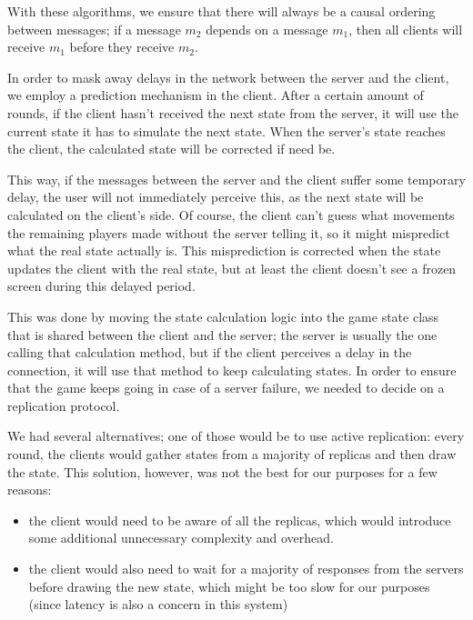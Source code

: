\documentclass[times, 10pt,twocolumn]{article}
\begin{document}
With these algorithms, we ensure that there will always be a causal ordering
between messages; if a message $m_2$ depends on a message $m_1$, then all
clients will receive $m_1$ before they receive $m_2$.


In order to mask away delays in the network between the server and the
client, we employ a prediction mechanism in the client. After a certain
amount of rounds, if the client hasn't received the next state from the
server, it will use the current state it has to simulate the next state.
When the server's state reaches the client, the calculated state will be
corrected if need be.

This way, if the messages between the server and the client suffer some
temporary delay, the user will not immediately perceive this, as the
next state will be calculated on the client's side. Of course, the client
can't guess what movements the remaining players made without the server
telling it, so it might mispredict what the real state actually is.
This misprediction is corrected when the state updates the client with
the real state, but at least the client doesn't see a frozen screen
during this delayed period.

This was done by moving the state calculation logic into the game state class
that is shared between the client and the server; the server is usually the
one calling that calculation method, but if the client perceives a delay in
the connection, it will use that method to keep calculating states.
In order to ensure that the game keeps going in case of a server failure,
we needed to decide on a replication protocol.

We had several alternatives; one of those would be to use active replication:
every round, the clients would gather states from a majority of replicas and
then draw the state. This solution, however, was not the best for our purposes
for a few reasons:
\begin{itemize}
  \item the client would need to be aware of all the replicas, which
        would introduce some additional unnecessary complexity and overhead.
  \item the client would also need to wait for a majority of responses from the
        servers before drawing the new state, which might be too slow for our
        purposes (since latency is also a concern in this system)
\end{itemize}
\end{document}
